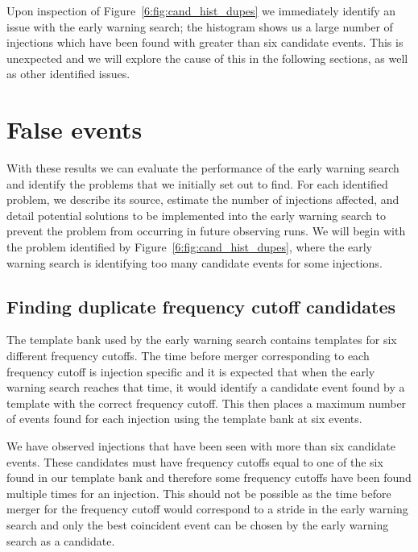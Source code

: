 Upon inspection of Figure~\ref{6:fig:cand_hist_dupes} we immediately identify an issue with the early warning search; the histogram shows us a large number of injections which have been found with greater than six candidate events. This is unexpected and we will explore the cause of this in the following sections, as well as other identified issues.

\section{\label{6:sec:false-problems}False events}

With these results we can evaluate the performance of the early warning search and identify the problems that we initially set out to find. For each identified problem, we describe its source, estimate the number of injections affected, and detail potential solutions to be implemented into the early warning search to prevent the problem from occurring in future observing runs. We will begin with the problem identified by Figure~\ref{6:fig:cand_hist_dupes}, where the early warning search is identifying too many candidate events for some injections.

\subsection{\label{6:sec:duplicate-frequency-cands}Finding duplicate frequency cutoff candidates}


The template bank used by the early warning search contains templates for six different frequency cutoffs. The time before merger corresponding to each frequency cutoff is injection specific and it is expected that when the early warning search reaches that time, it would identify a candidate event found by a template with the correct frequency cutoff. This then places a maximum number of events found for each injection using the template bank at six events.

We have observed injections that have been seen with more than six candidate events. These candidates must have frequency cutoffs equal to one of the six found in our template bank and therefore some frequency cutoffs have been found multiple times for an injection. This should not be possible as the time before merger for the frequency cutoff would correspond to a stride in the early warning search and only the best coincident event can be chosen by the early warning search as a candidate.

